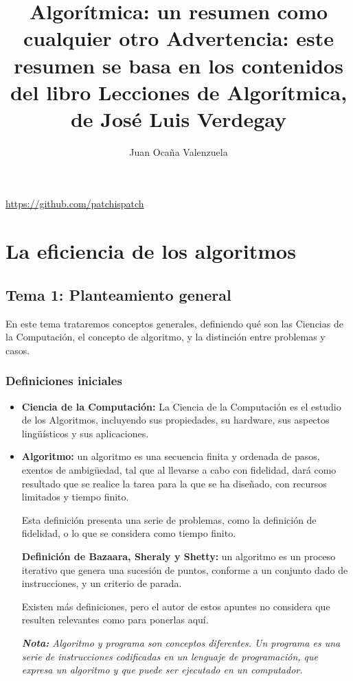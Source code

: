 \documentclass[11pt,a4paper]{article}
\author{	Juan Ocaña Valenzuela}
\title{\textbf{Algorítmica: un resumen como cualquier otro} 
 Advertencia: este resumen se basa en los contenidos del libro Lecciones de Algorítmica, de José Luis Verdegay}
\begin{document}
\thispagestyle{empty}

\maketitle

\begin{center}
\url{https://github.com/patchispatch}
\end{center}

\newpage

\tableofcontents

\newpage

\section{La eficiencia de los algoritmos}

\subsection{Tema 1: Planteamiento general}

En este tema trataremos conceptos generales, definiendo qué son las Ciencias de la Computación, el concepto de algoritmo, y la distinción entre problemas y casos. 

\subsubsection{Definiciones iniciales}

\begin{itemize}

\item \textbf{Ciencia de la Computación:} La Ciencia de la Computación es el estudio de los Algoritmos, incluyendo sus propiedades, su hardware, sus aspectos lingüísticos y sus aplicaciones.

\item \textbf{Algoritmo:} un algoritmo es una secuencia finita y ordenada de pasos, exentos de ambigüedad, tal que al llevarse a cabo con fidelidad, dará como resultado que se realice la tarea para la que se ha diseñado, con recursos limitados y tiempo finito.

\smallskip

Esta definición presenta una serie de problemas, como la definición de fidelidad, o lo que se considera como tiempo finito. 

\medskip

\textbf{Definición de Bazaara, Sheraly y Shetty:} un algoritmo es un proceso iterativo que genera una sucesión de puntos, conforme a un conjunto dado de instrucciones, y un criterio de parada.

\bigskip

Existen más definiciones, pero el autor de estos apuntes no considera que resulten relevantes como para ponerlas aquí.

\textit{\textbf{Nota:} Algoritmo y programa son conceptos diferentes. Un programa es una serie de instrucciones codificadas en un lenguaje de programación, que expresa un algoritmo y que puede ser ejecutado en un computador.}
\end{itemize}
\end{document}
